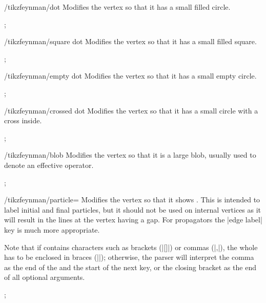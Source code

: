 \documentclass[a4paper,final]{ltxdoc}
\begin{document}
\begin{key}{/tikzfeynman/dot}
  Modifies the vertex so that it has a small filled circle.

\begin{codeexample}[]
;
\end{codeexample}
\end{key}

\begin{key}{/tikzfeynman/square dot}
  Modifies the vertex so that it has a small filled square.

\begin{codeexample}[]
;
\end{codeexample}
\end{key}

\begin{key}{/tikzfeynman/empty dot}
  Modifies the vertex so that it has a small empty circle.

\begin{codeexample}[]
;
\end{codeexample}
\end{key}

\begin{key}{/tikzfeynman/crossed dot}
  Modifies the vertex so that it has a small circle with a cross inside.

\begin{codeexample}[]
;
\end{codeexample}
\end{key}

\begin{key}{/tikzfeynman/blob}
  Modifies the vertex so that it is a large blob, usually used to denote an effective operator.

\begin{codeexample}[]
;
\end{codeexample}
\end{key}

\begin{key}{/tikzfeynman/particle=}
  Modifies the vertex so that it shows .  This is intended to label initial and final particles, but it should not be used on internal vertices as it will result in the lines at the vertex having a gap.  For propagators the |edge label| key is much more appropriate.

  Note that if  contains characters such as brackets (|[]|) or commas (|,|), the whole  has to be enclosed in braces (|{}|); otherwise, the parser will interpret the comma as the end of the  and the start of the next key, or the closing bracket as the end of all optional arguments.

\begin{codeexample}[]
;
\end{codeexample}
\end{key}
\end{document}
